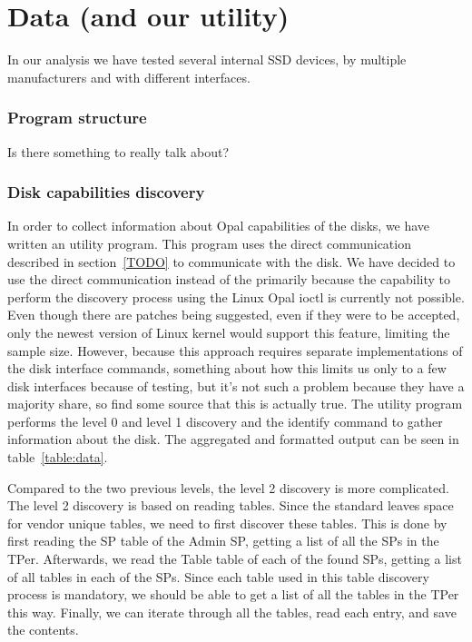 
\chapter{Data (and our utility)}

In our analysis we have tested several internal SSD devices, by multiple manufacturers and with different interfaces.

\subsection{Program structure}

Is there something to really talk about? 

\subsection{Disk capabilities discovery}


In order to collect information about Opal capabilities of the disks, we have written an utility program. This program uses the direct communication described in section~\ref{TODO} to communicate with the disk. We have decided to use the direct communication instead of the primarily because the capability to perform the discovery process using the Linux Opal ioctl is currently not possible. Even though there are patches being suggested, even if they were to be accepted, only the newest version of Linux kernel would support this feature, limiting the sample size.
However, because this approach requires separate implementations of the disk interface commands, something about how this limits us only to a few disk interfaces because of testing, but it's not such a problem because they have a majority share, so find some source that this is actually true.
The utility program performs the level 0 and level 1 discovery and the identify command to gather information about the disk.
The aggregated and formatted output can be seen in table~\ref{table:data}.

Compared to the two previous levels, the level 2 discovery is more complicated. The level 2 discovery is based on reading tables. Since the standard leaves space for vendor unique tables, we need to first discover these tables. This is done by first reading the SP table of the Admin SP, getting a list of all the SPs in the TPer. Afterwards, we read the Table table of each of the found SPs, getting a list of all tables in each of the SPs. Since each table used in this table discovery process is mandatory, we should be able to get a list of all the tables in the TPer this way. Finally, we can iterate through all the tables, read each entry, and save the contents.

